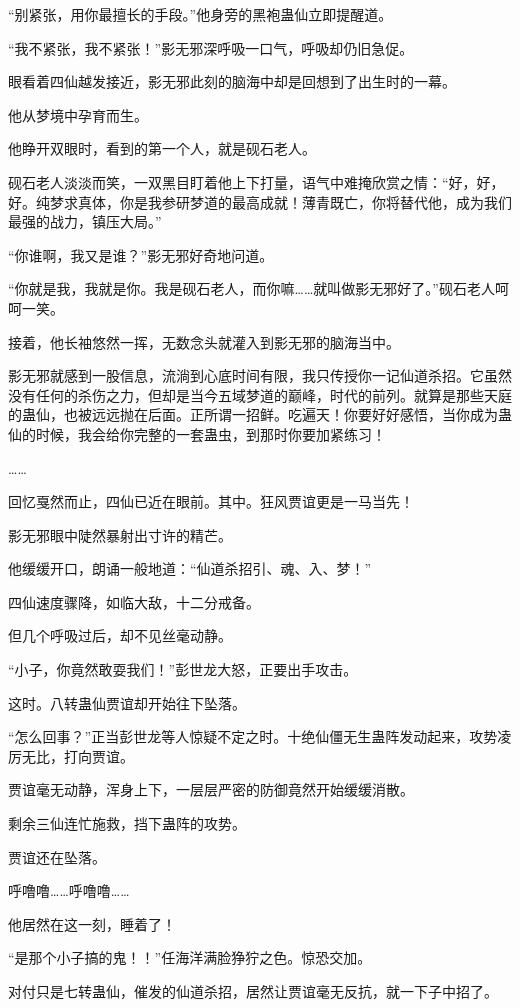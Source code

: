 \begin{this_body}
“别紧张，用你最擅长的手段。”他身旁的黑袍蛊仙立即提醒道。

“我不紧张，我不紧张！”影无邪深呼吸一口气，呼吸却仍旧急促。

眼看着四仙越发接近，影无邪此刻的脑海中却是回想到了出生时的一幕。

他从梦境中孕育而生。

他睁开双眼时，看到的第一个人，就是砚石老人。

砚石老人淡淡而笑，一双黑目盯着他上下打量，语气中难掩欣赏之情：“好，好，好。纯梦求真体，你是我参研梦道的最高成就！薄青既亡，你将替代他，成为我们最强的战力，镇压大局。”

“你谁啊，我又是谁？”影无邪好奇地问道。

“你就是我，我就是你。我是砚石老人，而你嘛……就叫做影无邪好了。”砚石老人呵呵一笑。

接着，他长袖悠然一挥，无数念头就灌入到影无邪的脑海当中。

影无邪就感到一股信息，流淌到心底时间有限，我只传授你一记仙道杀招。它虽然没有任何的杀伤之力，但却是当今五域梦道的巅峰，时代的前列。就算是那些天庭的蛊仙，也被远远抛在后面。正所谓一招鲜。吃遍天！你要好好感悟，当你成为蛊仙的时候，我会给你完整的一套蛊虫，到那时你要加紧练习！

……

回忆戛然而止，四仙已近在眼前。其中。狂风贾谊更是一马当先！

影无邪眼中陡然暴射出寸许的精芒。

他缓缓开口，朗诵一般地道：“仙道杀招引、魂、入、梦！”

四仙速度骤降，如临大敌，十二分戒备。

但几个呼吸过后，却不见丝毫动静。

“小子，你竟然敢耍我们！”彭世龙大怒，正要出手攻击。

这时。八转蛊仙贾谊却开始往下坠落。

“怎么回事？”正当彭世龙等人惊疑不定之时。十绝仙僵无生蛊阵发动起来，攻势凌厉无比，打向贾谊。

贾谊毫无动静，浑身上下，一层层严密的防御竟然开始缓缓消散。

剩余三仙连忙施救，挡下蛊阵的攻势。

贾谊还在坠落。

呼噜噜……呼噜噜……

他居然在这一刻，睡着了！

“是那个小子搞的鬼！！”任海洋满脸狰狞之色。惊恐交加。

对付只是七转蛊仙，催发的仙道杀招，居然让贾谊毫无反抗，就一下子中招了。


\end{this_body}
